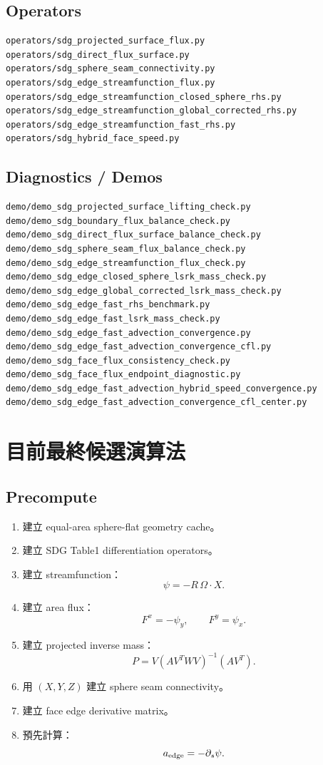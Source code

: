 \documentclass[UTF8,12pt,a4paper]{ctexart}
\begin{document}
\subsection{Operators}

\begin{lstlisting}[style=repo]
operators/sdg_projected_surface_flux.py
operators/sdg_direct_flux_surface.py
operators/sdg_sphere_seam_connectivity.py
operators/sdg_edge_streamfunction_flux.py
operators/sdg_edge_streamfunction_closed_sphere_rhs.py
operators/sdg_edge_streamfunction_global_corrected_rhs.py
operators/sdg_edge_streamfunction_fast_rhs.py
operators/sdg_hybrid_face_speed.py
\end{lstlisting}

\subsection{Diagnostics / Demos}

\begin{lstlisting}[style=repo]
demo/demo_sdg_projected_surface_lifting_check.py
demo/demo_sdg_boundary_flux_balance_check.py
demo/demo_sdg_direct_flux_surface_balance_check.py
demo/demo_sdg_sphere_seam_flux_balance_check.py
demo/demo_sdg_edge_streamfunction_flux_check.py
demo/demo_sdg_edge_closed_sphere_lsrk_mass_check.py
demo/demo_sdg_edge_global_corrected_lsrk_mass_check.py
demo/demo_sdg_edge_fast_rhs_benchmark.py
demo/demo_sdg_edge_fast_lsrk_mass_check.py
demo/demo_sdg_edge_fast_advection_convergence.py
demo/demo_sdg_edge_fast_advection_convergence_cfl.py
demo/demo_sdg_face_flux_consistency_check.py
demo/demo_sdg_face_flux_endpoint_diagnostic.py
demo/demo_sdg_edge_fast_advection_hybrid_speed_convergence.py
demo/demo_sdg_edge_fast_advection_convergence_cfl_center.py
\end{lstlisting}

\section{目前最終候選演算法}

\subsection{Precompute}

\begin{enumerate}
  \item 建立 equal-area sphere-flat geometry cache。
  \item 建立 SDG Table1 differentiation operators。
  \item 建立 streamfunction：
  \[
  \psi=-R\,\Omega\cdot X.
  \]
  \item 建立 area flux：
  \[
  F^x=-\psi_y,\qquad F^y=\psi_x.
  \]
  \item 建立 projected inverse mass：
  \[
  P=V(A V^TWV)^{-1}(A V^T).
  \]
  \item 用 $(X,Y,Z)$ 建立 sphere seam connectivity。
  \item 建立 face edge derivative matrix。
  \item 預先計算：
  \[
  a_{\rm edge}=-\partial_s\psi.
  \]
\end{enumerate}
\end{document}

